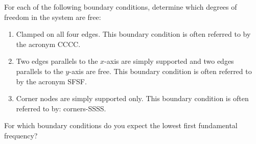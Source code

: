 \documentclass[12pt]{article}
\begin{document}
For each of the following boundary conditions, determine which degrees of freedom in the system are free:
\begin{enumerate}
  \item Clamped on all four edges. This boundary condition is often referred
        to by the acronym CCCC.
  \item Two edges parallels to the $x$-axis are simply supported and two edges parallels to the $y$-axis are free. This boundary condition is often referred to by the acronym SFSF.
  \item Corner nodes are simply supported only. This boundary condition is often referred to by: corners-SSSS.
\end{enumerate}
For which boundary conditions do you expect the lowest first fundamental frequency?
\end{document}
